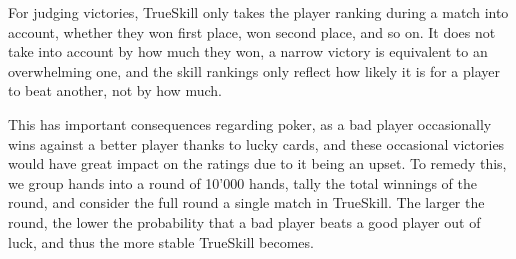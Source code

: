 For judging victories, TrueSkill only takes the player ranking during a match into account, whether they won first place, won second place, and so on. It does not take into account by how much they won, a narrow victory is equivalent to an overwhelming one, and the skill rankings only reflect how likely it is for a player to beat another, not by how much.

This has important consequences regarding poker, as a bad player occasionally wins against a better player thanks to lucky cards, and these occasional victories would have great impact on the ratings due to it being an upset. To remedy this, we group hands into a round of 10'000 hands, tally the total winnings of the round, and consider the full round a single match in TrueSkill. The larger the round, the lower the probability that a bad player beats a good player out of luck, and thus the more stable TrueSkill becomes.
